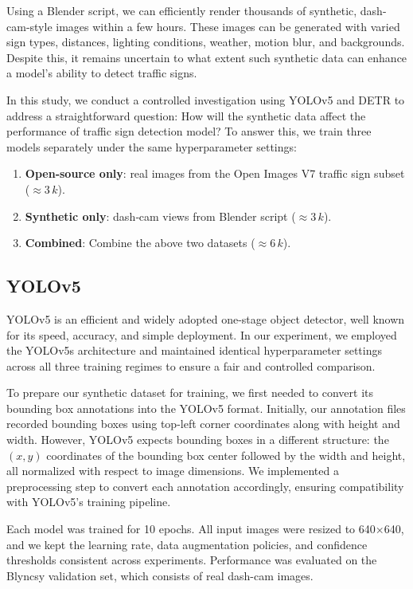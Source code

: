 \documentclass[journal]{IEEEtran}
\begin{document}
Using a Blender script, we can efficiently render thousands of synthetic, dash-cam-style images within a few hours. These images can be generated with varied sign types, distances, lighting conditions, weather, motion blur, and backgrounds. Despite this, it remains uncertain to what extent such synthetic data can enhance a model’s ability to detect traffic signs.

In this study, we conduct a controlled investigation using YOLOv5 and DETR to address a straightforward question: How will the synthetic data affect the performance of traffic sign detection model? To answer this, we train three models separately under the same hyperparameter settings:

\begin{enumerate}
  \item \textbf{Open‑source only}: real images from the Open Images V7 traffic sign subset ($\approx3\,k$).
  \item \textbf{Synthetic only}: dash‑cam views from Blender script ($\approx3\,k$).
  \item \textbf{Combined}: Combine the above two datasets ($\approx6\,k$).
\end{enumerate}

\subsection{YOLOv5}
YOLOv5 is an efficient and widely adopted one-stage object detector, well known for its speed, accuracy, and simple deployment. In our experiment, we employed the YOLOv5s architecture and maintained identical hyperparameter settings across all three training regimes to ensure a fair and controlled comparison.

To prepare our synthetic dataset for training, we first needed to convert its bounding box annotations into the YOLOv5 format. Initially, our annotation files recorded bounding boxes using top-left corner coordinates along with height and width. However, YOLOv5 expects bounding boxes in a different structure: the $(x, y)$ coordinates of the bounding box center followed by the width and height, all normalized with respect to image dimensions. We implemented a preprocessing step to convert each annotation accordingly, ensuring compatibility with YOLOv5’s training pipeline.

Each model was trained for 10 epochs. All input images were resized to 640×640, and we kept the learning rate, data augmentation policies, and confidence thresholds consistent across experiments. Performance was evaluated on the Blyncsy validation set, which consists of real dash-cam images.
\end{document}
